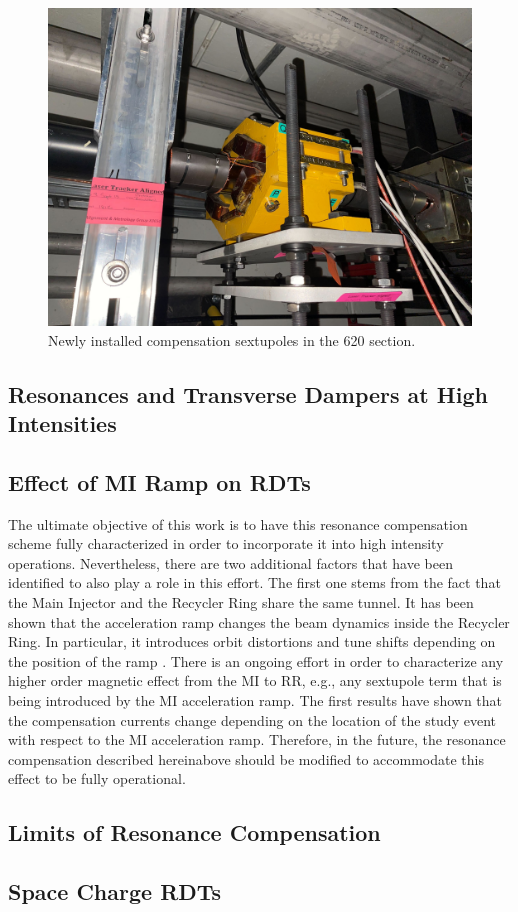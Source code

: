 \begin{figure}[H]
    \centering
    \includegraphics[width=\columnwidth]{chapter7/620_sext.jpg}
    \caption{Newly installed compensation sextupoles in the 620 section.}
    \label{fig:new620sexts}
\end{figure}

\subsection{Resonances and Transverse Dampers at High Intensities}


\subsection{Effect of MI Ramp on RDTs}

The ultimate objective of this work is to have this resonance compensation scheme fully characterized in order to incorporate it into high intensity operations. Nevertheless, there are two additional factors that have been identified to also play a role in this effort. The first one stems from the fact that the Main Injector and the Recycler Ring share the same tunnel. It has been shown that the acceleration ramp changes the beam dynamics inside the Recycler Ring. In particular, it introduces orbit distortions and tune shifts depending on the position of the ramp \cite{mionrr}. There is an ongoing effort in order to characterize any higher order magnetic effect from the MI to RR, e.g., any sextupole term that is being introduced by the MI acceleration ramp. The first results have shown that the compensation currents change depending on the location of the study event with respect to the MI acceleration ramp. Therefore, in the future, the resonance compensation described hereinabove should be modified to accommodate this effect to be fully operational.

\subsection{Limits of Resonance Compensation}

\subsection{Space Charge RDTs}
